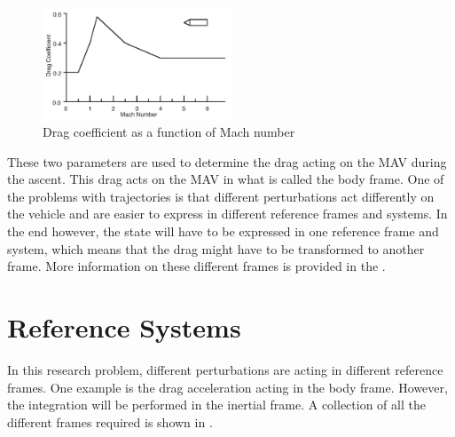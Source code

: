 \begin{figure}[H]
\centering
\includegraphics[width=0.5\textwidth]{figures/launcher_methods/dragcoeff_whitehead2004mars.jpg}
\caption{Drag coefficient as a function of Mach number \cite{whitehead2004mars}}
\label{fig:dragcoeff_whitehead2004mars}
\end{figure}

\noindent
These two parameters are used to determine the drag acting on the \ac{MAV} during the ascent. This drag acts on the \ac{MAV} in what is called the body frame. One of the problems with trajectories is that different perturbations act differently on the vehicle and are easier to express in different reference frames and systems. In the end however, the state will have to be expressed in one reference frame and system, which means that the drag might have to be transformed to another frame. More information on these different frames is provided in the .




\section{Reference Systems}
\label{sec:referenceSystems}
In this research problem, different perturbations are acting in different reference frames. One example is the drag acceleration acting in the body frame. However, the integration will be performed in the inertial frame. A collection of all the different frames required is shown in .



